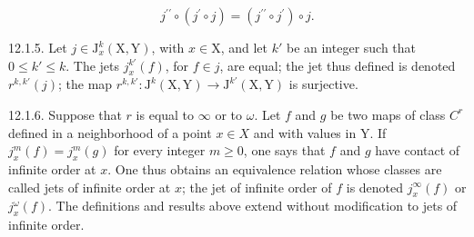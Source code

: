 \[
j ^ {\prime \prime} \circ (j ^ {\prime} \circ j) = (j ^ {\prime \prime} \circ j ^ {\prime}) \circ j.
\]

12.1.5. Let \(j \in \mathrm{J}_x^k(\mathrm{X}, \mathrm{Y})\), with \(x \in \mathrm{X}\), and let \(k'\) be an integer such that \(0 \leqslant k' \leqslant k\). The jets \(j_x^{k'}(f)\), for \(f \in j\), are equal; the jet thus defined is denoted \(r^{k, k'}(j)\); the map \(r^{k, k'}: \mathrm{J}^k(\mathrm{X}, \mathrm{Y}) \to \mathrm{J}^{k'}(\mathrm{X}, \mathrm{Y})\) is surjective.

12.1.6. Suppose that \(r\) is equal to \(\infty\) or to \(\omega\). Let \(f\) and \(g\) be two maps of class \(C^{r}\) defined in a neighborhood of a point \(x \in X\) and with values in Y. If \(j_x^m(f) = j_x^m(g)\) for every integer \(m \geqslant 0\), one says that \(f\) and \(g\) have contact of infinite order at \(x\). One thus obtains an equivalence relation whose classes are called jets of infinite order at \(x\); the jet of infinite order of \(f\) is denoted \(j_x^\infty(f)\) or \(j_x^\omega(f)\). The definitions and results above extend without modification to jets of infinite order.


